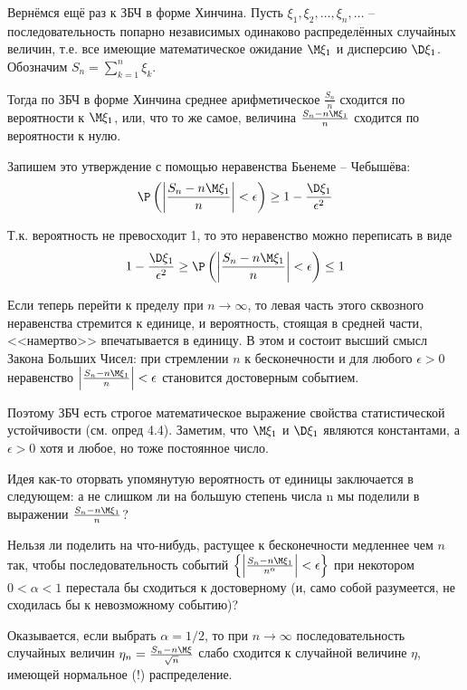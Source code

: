 \begin{zam}
Вернёмся ещё раз к ЗБЧ в форме Хинчина. Пусть $\xi_1 , \xi_2 , \ldots , \xi_n , \ldots$ -- последовательность попарно независимых одинаково распределённых случайных величин, т.е. все имеющие математическое ожидание $\M\xi_1$ и дисперсию $\D\xi_1$. Обозначим $S_n=\sum\limits_{k=1}^n\xi_k$. 

Тогда по ЗБЧ в форме Хинчина среднее арифметическое $\frac{S_n}{n}$ сходится по вероятности к $\M\xi_1$, или, что то же самое, величина $\frac{S_n-n\M\xi_1}{n}$ сходится по вероятности к нулю. 

Запишем это утверждение с помощью неравенства Бьенеме – Чебышёва:
$$
\P\left( \left|\frac{S_n-n\M\xi_1}{n}\right| < \epsilon \right) \geq 1-\frac{\D\xi_1}{\epsilon^2}
$$

Т.к. вероятность не превосходит 1, то это неравенство можно переписать в виде
$$
1-\frac{\D\xi_1}{\epsilon^2} \geq \P\left( \left|\frac{S_n-n\M\xi_1}{n}\right| < \epsilon \right) \leq 1 
$$

Если теперь перейти к пределу при $n \to \infty$, то левая часть этого сквозного неравенства стремится к единице, и вероятность, стоящая в средней части, <<намертво>> впечатывается в единицу. В этом и состоит высший
смысл Закона Больших Чисел: при стремлении $n$ к бесконечности и для любого $\epsilon > 0$ неравенство  $\left|\frac{S_n-n\M\xi_1}{n}\right|  < \epsilon$ становится достоверным событием. 

Поэтому ЗБЧ есть строгое математическое выражение свойства
статистической устойчивости (см. опред 4.4). Заметим, что $\M\xi_1$ и $\D\xi_1$ являются константами, а $\epsilon > 0$ хотя и любое, но тоже постоянное число.

Идея как-то оторвать упомянутую вероятность от единицы заключается в следующем: а не слишком ли на большую степень числа n мы поделили в выражении $\frac{S_n-n\M\xi_1}{n}$?

Нельзя ли поделить на что-нибудь, растущее к бесконечности
медленнее чем $n$ так, чтобы последовательность событий
$\left\{\left|\frac{S_n-n\M\xi_1}{n^\alpha}\right|  < \epsilon\right\}$
при некотором $0 < \alpha < 1$ перестала бы сходиться к достоверному (и, само собой разумеется, не сходилась бы к невозможному событию)? 

Оказывается, если выбрать $\alpha = 1/2$, то при $n \to \infty$ последовательность случайных величин $\eta_n = \frac{S_n -n\M\xi}{\sqrt{n}}$ слабо сходится к случайной величине $\eta$, имеющей нормальное (!) распределение.
\end{zam}

